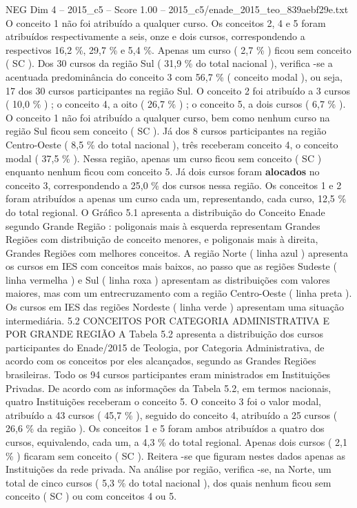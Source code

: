 \begin{textsample}{NEG Dim 4 – 2015\_c5 – Score 1.00 – 2015\_c5/enade\_2015\_teo\_839aebf29e.txt}
O conceito 1 não foi atribuído a qualquer curso.
Os conceitos 2, 4 e 5 foram atribuídos respectivamente a seis, onze e dois cursos, correspondendo a respectivos 16,2 \%, 29,7 \% e 5,4 \%.
Apenas um curso ( 2,7 \% ) ficou sem conceito ( SC ).
Dos 30 cursos da região Sul ( 31,9 \% do total nacional ), verifica -se a acentuada predominância do conceito 3 com 56,7 \% ( conceito modal ), ou seja, 17 dos 30 cursos participantes na região Sul.
O conceito 2 foi atribuído a 3 cursos ( 10,0 \% ) ; o conceito 4, a oito ( 26,7 \% ) ; o conceito 5, a dois cursos ( 6,7 \% ).
O conceito 1 não foi atribuído a qualquer curso, bem como nenhum curso na região Sul ficou sem conceito ( SC ).
Já dos 8 cursos participantes na região Centro-Oeste ( 8,5 \% do total nacional ), três receberam conceito 4, o conceito modal ( 37,5 \% ).
Nessa região, apenas um curso ficou sem conceito ( SC ) enquanto nenhum ficou com conceito 5.
Já dois cursos foram \textbf{alocados} no conceito 3, correspondendo a 25,0 \% dos cursos nessa região.
Os conceitos 1 e 2 foram atribuídos a apenas um curso cada um, representando, cada curso, 12,5 \% do total regional.
O Gráfico 5.1 apresenta a distribuição do Conceito Enade segundo Grande Região : poligonais mais à esquerda representam Grandes Regiões com distribuição de conceito menores, e poligonais mais à direita, Grandes Regiões com melhores conceitos.
A região Norte ( linha azul ) apresenta os cursos em IES com conceitos mais baixos, ao passo que as regiões Sudeste ( linha vermelha ) e Sul ( linha roxa ) apresentam as distribuições com valores maiores, mas com um entrecruzamento com a região Centro-Oeste ( linha preta ).
Os cursos em IES das regiões Nordeste ( linha verde ) apresentam uma situação intermediária. 5.2 CONCEITOS POR CATEGORIA ADMINISTRATIVA E POR GRANDE REGIÃO A Tabela 5.2 apresenta a distribuição dos cursos participantes do Enade/2015 de Teologia, por Categoria Administrativa, de acordo com os conceitos por eles alcançados, segundo as Grandes Regiões brasileiras.
Todo os 94 cursos participantes eram ministrados em Instituições Privadas.
De acordo com as informações da Tabela 5.2, em termos nacionais, quatro Instituições receberam o conceito 5.
O conceito 3 foi o valor modal, atribuído a 43 cursos ( 45,7 \% ), seguido do conceito 4, atribuído a 25 cursos ( 26,6 \% da região ).
Os conceitos 1 e 5 foram ambos atribuídos a quatro dos cursos, equivalendo, cada um, a 4,3 \% do total regional.
Apenas dois cursos ( 2,1 \% ) ficaram sem conceito ( SC ).
Reitera -se que figuram nestes dados apenas as Instituições da rede privada.
Na análise por região, verifica -se, na Norte, um total de cinco cursos ( 5,3 \% do total nacional ), dos quais nenhum ficou sem conceito ( SC ) ou com conceitos 4 ou 5.

\end{textsample}
